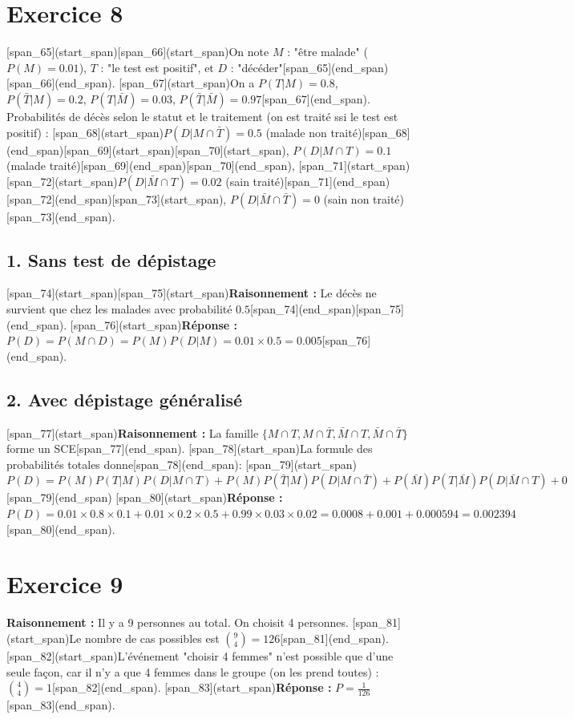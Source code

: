 \documentclass[11pt,a4paper]{article}
\begin{document}
\section*{Exercice 8}
[span_65](start_span)[span_66](start_span)On note $M$ : "être malade" ($P(M) = 0.01$), $T$ : "le test est positif", et $D$ : "décéder"[span_65](end_span)[span_66](end_span).
[span_67](start_span)On a $P(T|M) = 0.8$, $P(\bar{T}|M) = 0.2$, $P(T|\bar{M}) = 0.03$, $P(\bar{T}|\bar{M}) = 0.97$[span_67](end_span).
Probabilités de décès selon le statut et le traitement (on est traité ssi le test est positif) :
[span_68](start_span)$P(D|M \cap \bar{T}) = 0.5$ (malade non traité)[span_68](end_span)[span_69](start_span)[span_70](start_span), $P(D|M \cap T) = 0.1$ (malade traité)[span_69](end_span)[span_70](end_span),
[span_71](start_span)[span_72](start_span)$P(D|\bar{M} \cap T) = 0.02$ (sain traité)[span_71](end_span)[span_72](end_span)[span_73](start_span), $P(D|\bar{M} \cap \bar{T}) = 0$ (sain non traité)[span_73](end_span).

\subsection*{1. Sans test de dépistage}
[span_74](start_span)[span_75](start_span)\textbf{Raisonnement :} Le décès ne survient que chez les malades avec probabilité $0.5$[span_74](end_span)[span_75](end_span).
[span_76](start_span)\textbf{Réponse :} $P(D) = P(M \cap D) = P(M)P(D|M) = 0.01 \times 0.5 = 0.005$[span_76](end_span).

\subsection*{2. Avec dépistage généralisé}
[span_77](start_span)\textbf{Raisonnement :} La famille $\{M \cap T, M \cap \bar{T}, \bar{M} \cap T, \bar{M} \cap \bar{T}\}$ forme un SCE[span_77](end_span). 
[span_78](start_span)La formule des probabilités totales donne[span_78](end_span):
[span_79](start_span)$P(D) = P(M)P(T|M)P(D|M \cap T) + P(M)P(\bar{T}|M)P(D|M \cap \bar{T}) + P(\bar{M})P(T|\bar{M})P(D|\bar{M} \cap T) + 0$[span_79](end_span)
[span_80](start_span)\textbf{Réponse :} $P(D) = 0.01 \times 0.8 \times 0.1 + 0.01 \times 0.2 \times 0.5 + 0.99 \times 0.03 \times 0.02 = 0.0008 + 0.001 + 0.000594 = 0.002394$[span_80](end_span).

\hrulefill

\section*{Exercice 9}
\textbf{Raisonnement :} Il y a 9 personnes au total. On choisit 4 personnes. [span_81](start_span)Le nombre de cas possibles est $\binom{9}{4} = 126$[span_81](end_span).
[span_82](start_span)L'événement "choisir 4 femmes" n'est possible que d'une seule façon, car il n'y a que 4 femmes dans le groupe (on les prend toutes) : $\binom{4}{4} = 1$[span_82](end_span).
[span_83](start_span)\textbf{Réponse :} $P = \frac{1}{126}$[span_83](end_span).
\end{document}
